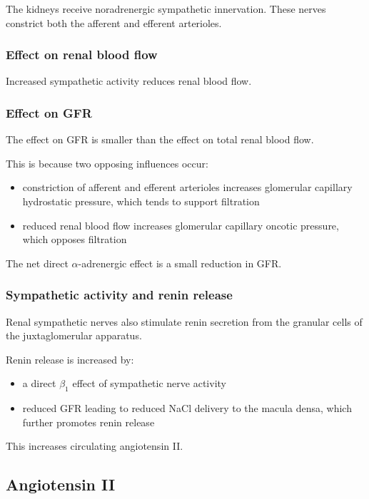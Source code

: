 \documentclass[11pt,a4paper]{article}
\begin{document}
The kidneys receive noradrenergic sympathetic innervation. These nerves constrict both the afferent and efferent arterioles.

\subsubsection{Effect on renal blood flow}

Increased sympathetic activity reduces renal blood flow.

\subsubsection{Effect on GFR}

The effect on GFR is smaller than the effect on total renal blood flow.

This is because two opposing influences occur:
\begin{itemize}
    \item constriction of afferent and efferent arterioles increases glomerular capillary hydrostatic pressure, which tends to support filtration
    \item reduced renal blood flow increases glomerular capillary oncotic pressure, which opposes filtration
\end{itemize}

The net direct $\alpha$-adrenergic effect is a small reduction in GFR.

\subsubsection{Sympathetic activity and renin release}

Renal sympathetic nerves also stimulate renin secretion from the granular cells of the juxtaglomerular apparatus.

Renin release is increased by:
\begin{itemize}
    \item a direct $\beta_1$ effect of sympathetic nerve activity
    \item reduced GFR leading to reduced NaCl delivery to the macula densa, which further promotes renin release
\end{itemize}

This increases circulating angiotensin II.

\subsection{Angiotensin II}
\end{document}
